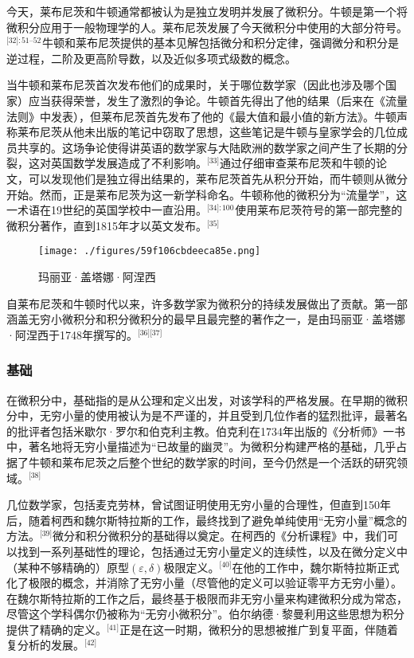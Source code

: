 今天，莱布尼茨和牛顿通常都被认为是独立发明并发展了微积分。牛顿是第一个将微积分应用于一般物理学的人。莱布尼茨发展了今天微积分中使用的大部分符号。\(^\text{[32]: 51–52}\) 牛顿和莱布尼茨提供的基本见解包括微分和积分定律，强调微分和积分是逆过程，二阶及更高阶导数，以及近似多项式级数的概念。

当牛顿和莱布尼茨首次发布他们的成果时，关于哪位数学家（因此也涉及哪个国家）应当获得荣誉，发生了激烈的争论。牛顿首先得出了他的结果（后来在《流量法则》中发表），但莱布尼茨首先发布了他的《最大值和最小值的新方法》。牛顿声称莱布尼茨从他未出版的笔记中窃取了思想，这些笔记是牛顿与皇家学会的几位成员共享的。这场争论使得讲英语的数学家与大陆欧洲的数学家之间产生了长期的分裂，这对英国数学发展造成了不利影响。\(^\text{[33]}\)通过仔细审查莱布尼茨和牛顿的论文，可以发现他们是独立得出结果的，莱布尼茨首先从积分开始，而牛顿则从微分开始。然而，正是莱布尼茨为这一新学科命名。牛顿称他的微积分为“流量学”，这一术语在19世纪的英国学校中一直沿用。\(^\text{[34]: 100}\) 使用莱布尼茨符号的第一部完整的微积分著作，直到1815年才以英文发布。\(^\text{[35]}\)
\begin{figure}[ht]
\centering
\texttt{[image: ./figures/59f106cbdeeca85e.png]}
\caption{玛丽亚·盖塔娜·阿涅西} \label{fig_Calcul_6}
\end{figure}
自莱布尼茨和牛顿时代以来，许多数学家为微积分的持续发展做出了贡献。第一部涵盖无穷小微积分和积分微积分的最早且最完整的著作之一，是由玛丽亚·盖塔娜·阿涅西于1748年撰写的。\(^\text{[36][37]}\)
\subsubsection{基础} 
在微积分中，基础指的是从公理和定义出发，对该学科的严格发展。在早期的微积分中，无穷小量的使用被认为是不严谨的，并且受到几位作者的猛烈批评，最著名的批评者包括米歇尔·罗尔和伯克利主教。伯克利在1734年出版的《分析师》一书中，著名地将无穷小量描述为“已故量的幽灵”。为微积分构建严格的基础，几乎占据了牛顿和莱布尼茨之后整个世纪的数学家的时间，至今仍然是一个活跃的研究领域。\(^\text{[38]}\)

几位数学家，包括麦克劳林，曾试图证明使用无穷小量的合理性，但直到150年后，随着柯西和魏尔斯特拉斯的工作，最终找到了避免单纯使用“无穷小量”概念的方法。\(^\text{[39]}\)微分和积分微积分的基础得以奠定。在柯西的《分析课程》中，我们可以找到一系列基础性的理论，包括通过无穷小量定义的连续性，以及在微分定义中（某种不够精确的）原型\((\varepsilon,\delta)\)极限定义。\(^\text{[40]}\)在他的工作中，魏尔斯特拉斯正式化了极限的概念，并消除了无穷小量（尽管他的定义可以验证零平方无穷小量）。在魏尔斯特拉斯的工作之后，最终基于极限而非无穷小量来构建微积分成为常态，尽管这个学科偶尔仍被称为“无穷小微积分”。伯尔纳德·黎曼利用这些思想为积分提供了精确的定义。\(^\text{[41]}\)正是在这一时期，微积分的思想被推广到复平面，伴随着复分析的发展。\(^\text{[42]}\)

